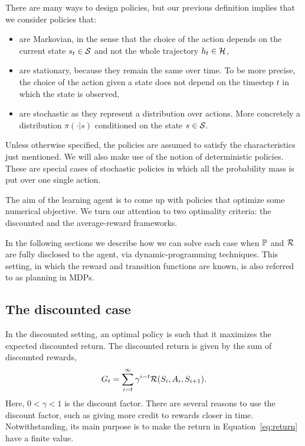 There are many ways to design policies, but our previous definition implies that we consider policies that:
\begin{itemize}
  \item are Markovian, in the sense that the choice of the action depends on the current state $s_t\in\mathcal{S}$ and not the whole trajectory $h_t\in\mathcal{H}$, 
  \item are stationary, because they remain the same over time. To be more precise, the choice of the action given a state does not depend on the timestep $t$ in which the state is observed,
  \item are stochastic as they represent a distribution over actions. More concretely a distribution $\pi(\cdot\lvert s)$ conditioned on the state $s\in\mathcal{S}$. 
\end{itemize}
Unless otherwise specified, the policies are assumed to satisfy the characteristics just mentioned. We will also make use of the notion of deterministic policies. These are special cases of stochastic policies in which all the probability mass is put over one single action.

The aim of the learning agent is to come up with policies that optimize some numerical objective. We turn our attention to two optimality criteria: the discounted and the average-reward frameworks. 

In the following sections we describe how we can solve each case when $\mathbb{P}$ and $\mathcal{R}$ are fully disclosed to the agent, via dynamic-programming techniques. This setting, in which the reward and transition functions are known, is also referred to as planning in MDPs.

\subsection{The discounted case}
In the discounted setting, an optimal policy is such that it maximizes the expected discounted return. The discounted return is given by the sum of discounted rewards, 
\begin{equation}
  G_t = \sum_{i=t} ^\infty \gamma ^ {i-t} \mathcal{R}(S_i, A_i, S_{i+1}).
  \label{eq:return}
\end{equation}
Here, $0<\gamma<1$ is the discount factor. There are several reasons to use the discount factor, such as giving more credit to rewards closer in time. Notwithstanding, its main purpose is to make the return in Equation~\ref{eq:return} have a finite value.

